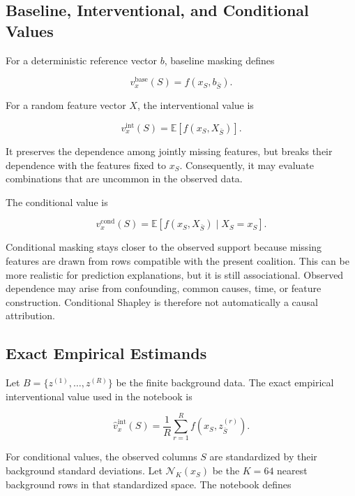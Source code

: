 \documentclass[11pt]{article}
\newcommand{\E}{\mathbb{E}}
\begin{document}
\subsection{Baseline, Interventional, and Conditional Values}

For a deterministic reference vector \(b\), baseline masking defines

\begin{equation}
v_x^{\mathrm{base}}(S)=f(x_S,b_{\bar S}).
\end{equation}

For a random feature vector \(X\), the interventional value is

\begin{equation}
v_x^{\mathrm{int}}(S)
=\E\left[f(x_S,X_{\bar S})\right].
\label{eq:interventional}
\end{equation}

It preserves the dependence among jointly missing features, but breaks their
dependence with the features fixed to \(x_S\).  Consequently, it may evaluate
combinations that are uncommon in the observed data.

The conditional value is

\begin{equation}
v_x^{\mathrm{cond}}(S)
=\E\left[f(x_S,X_{\bar S})\mid X_S=x_S\right].
\label{eq:conditional}
\end{equation}

Conditional masking stays closer to the observed support because missing
features are drawn from rows compatible with the present coalition.  This can
be more realistic for prediction explanations, but it is still associational.
Observed dependence may arise from confounding, common causes, time, or feature
construction.  Conditional Shapley is therefore not automatically a causal
attribution.

\subsection{Exact Empirical Estimands}

Let \(B=\{z^{(1)},\ldots,z^{(R)}\}\) be the finite background data.  The exact
empirical interventional value used in the notebook is

\begin{equation}
\widehat v_x^{\mathrm{int}}(S)
=\frac{1}{R}\sum_{r=1}^{R}f(x_S,z^{(r)}_{\bar S}).
\label{eq:exact-interventional}
\end{equation}

For conditional values, the observed columns \(S\) are standardized by their
background standard deviations.  Let \(\mathcal N_K(x_S)\) be the \(K=64\)
nearest background rows in that standardized space.  The notebook defines
\end{document}
